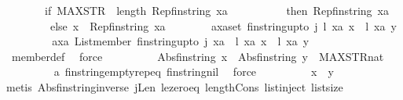 \begin{isabellebody}
\ \ \ \ \ \ \ \ {\isacharparenleft}if\ MAX{\isacharunderscore}STR\ {\isasymle}\ length\ {\isacharparenleft}Rep{\isacharunderscore}fin{\isacharunderscore}string\ xa{\isacharparenright}\ \isanewline
\ \ \ \ \ \ \ \ \ then\ Rep{\isacharunderscore}fin{\isacharunderscore}string\ xa\ \isanewline
\ \ \ \ \ \ \ \ \ else\ x\ {\isacharhash}\ Rep{\isacharunderscore}fin{\isacharunderscore}string\ xa{\isacharparenright}{\isacharparenright}{\isachardoublequoteclose}\isanewline
\ \ \ \ \ \ \isamarkupfalse%
\ a{}{\isacharcolon}{\isachardoublequoteopen}{\isasymforall}xa{\isasymin}set\ {\isacharparenleft}fin{\isacharunderscore}string{\isacharunderscore}upto\ j{\isacharparenright}{\isachardot}\ {\isacharquery}l\ xa\ x\ {\isacharequal}\ {\isacharquery}l\ xa\ y{\isachardoublequoteclose}\isanewline
\ \ \ \ \ \ \isamarkupfalse%
\ \isamarkupfalse%
\ a{}{\isacharcolon}{\isachardoublequoteopen}{\isasymAnd}xa{\isachardot}\ {\isacharparenleft}List{\isachardot}member\ {\isacharparenleft}fin{\isacharunderscore}string{\isacharunderscore}upto\ j{\isacharparenright}\ xa{\isacharparenright}\ {\isasymLongrightarrow}\ {\isacharquery}l\ xa\ x\ {\isacharequal}\ {\isacharquery}l\ xa\ y{\isachardoublequoteclose}\isanewline
\ \ \ \ \ \ \ \ \isamarkupfalse%
\ \ member{\isacharunderscore}def\ \isamarkupfalse%
\ force\isanewline
\ \ \ \ \ \ \isamarkupfalse%
\ \isamarkupfalse%
\ {\isachardoublequoteopen}Abs{\isacharunderscore}fin{\isacharunderscore}string\ {\isacharbrackleft}x{\isacharbrackright}\ {\isacharequal}\ Abs{\isacharunderscore}fin{\isacharunderscore}string\ {\isacharbrackleft}y{\isacharbrackright}\ {\isasymor}\ {\isacharparenleft}MAX{\isacharunderscore}STR{\isacharcolon}{\isacharcolon}nat{\isacharparenright}\ {\isacharequal}\ {}{\isachardoublequoteclose}\isanewline
\ \ \ \ \ \ \ \ \isamarkupfalse%
\ a{}\ fin{\isacharunderscore}string{\isacharunderscore}empty{\isachardot}rep{\isacharunderscore}eq\ fin{\isacharunderscore}string{\isacharunderscore}nil\ \isamarkupfalse%
\ force\isanewline
\ \ \ \ \ \ \isamarkupfalse%
\ \isamarkupfalse%
\ {\isachardoublequoteopen}x\ {\isacharequal}\ y{\isachardoublequoteclose}\isanewline
\ \ \ \ \ \ \ \ \isamarkupfalse%
\ {\isacharparenleft}metis\ Abs{\isacharunderscore}fin{\isacharunderscore}string{\isacharunderscore}inverse\ jLen\ le{\isacharunderscore}zero{\isacharunderscore}eq\ length{\isacharunderscore}Cons\ list{\isachardot}inject\ list{\isachardot}size{\isacharparenleft}{}{\isacharparenright}\ \isanewline

\end{isabellebody}
